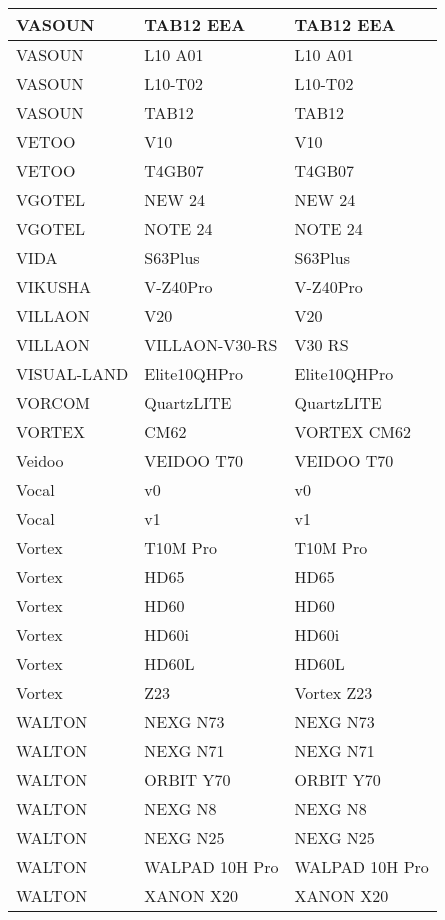 \begin{tabularx}{\linewidth}{|l|X|X|}
        VASOUN & TAB12 EEA & TAB12 EEA \\ \hline
        VASOUN & L10 A01 & L10 A01 \\ \hline
        VASOUN & L10-T02 & L10-T02 \\ \hline
        VASOUN & TAB12 & TAB12 \\ \hline
        VETOO & V10 & V10 \\ \hline
        VETOO & T4GB07 & T4GB07 \\ \hline
        VGOTEL & NEW 24 & NEW 24 \\ \hline
        VGOTEL & NOTE 24 & NOTE 24 \\ \hline
        VIDA & S63Plus & S63Plus \\ \hline
        VIKUSHA & V-Z40Pro & V-Z40Pro \\ \hline
        VILLAON & V20 & V20 \\ \hline
        VILLAON & VILLAON-V30-RS & V30 RS \\ \hline
        VISUAL-LAND & Elite10QHPro & Elite10QHPro \\ \hline
        VORCOM & QuartzLITE & QuartzLITE \\ \hline
        VORTEX & CM62 & VORTEX CM62 \\ \hline
        Veidoo & VEIDOO T70 & VEIDOO T70 \\ \hline
        Vocal & v0 & v0 \\ \hline
        Vocal & v1 & v1 \\ \hline
        Vortex & T10M Pro & T10M Pro \\ \hline
        Vortex & HD65 & HD65 \\ \hline
        Vortex & HD60 & HD60 \\ \hline
        Vortex & HD60i & HD60i \\ \hline
        Vortex & HD60L & HD60L \\ \hline
        Vortex & Z23 & Vortex Z23 \\ \hline
        WALTON & NEXG N73 & NEXG N73 \\ \hline
        WALTON & NEXG N71 & NEXG N71 \\ \hline
        WALTON & ORBIT Y70 & ORBIT Y70 \\ \hline
        WALTON & NEXG N8 & NEXG N8 \\ \hline
        WALTON & NEXG N25 & NEXG N25 \\ \hline
        WALTON & WALPAD 10H Pro & WALPAD 10H Pro \\ \hline
        WALTON & XANON X20 & XANON X20 \\ \hline

\end{tabularx}
